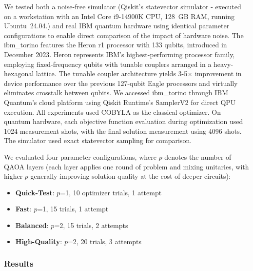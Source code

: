 \documentclass[preprint,3p,12pt,authoryear]{elsarticle}
\begin{document}
We tested both a noise-free simulator (Qiskit's statevector simulator - {\color{red}executed on a workstation with an Intel Core i9-14900K CPU, 128~GB RAM, running Ubuntu~24.04.}) and real IBM quantum hardware using identical parameter configurations to enable direct comparison of the impact of hardware noise. The ibm\_torino features the Heron r1 processor with 133 qubits, introduced in December 2023. Heron represents IBM's highest-performing processor family, employing fixed-frequency qubits with tunable couplers arranged in a heavy-hexagonal lattice. The tunable coupler architecture yields 3-5$\times$ improvement in device performance over the previous 127-qubit Eagle processors and virtually eliminates crosstalk between qubits. We accessed ibm\_torino through IBM Quantum's cloud platform using Qiskit Runtime's SamplerV2 for direct QPU execution. All experiments used COBYLA as the classical optimizer. On quantum hardware, each objective function evaluation during optimization used 1024 measurement shots, with the final solution measurement using 4096 shots. The simulator used exact statevector sampling for comparison.

We evaluated four parameter configurations, where $p$ denotes the number of QAOA layers (each layer applies one round of problem and mixing unitaries, with higher $p$ generally improving solution quality at the cost of deeper circuits):


\begin{itemize}
\item \textbf{Quick-Test}: $p$=1, 10 optimizer trials, 1 attempt
\item \textbf{Fast}: $p$=1, 15 trials, 1 attempt
\item \textbf{Balanced}: $p$=2, 15 trials, 2 attempts
\item \textbf{High-Quality}: $p$=2, 20 trials, 3 attempts
\end{itemize}

\subsubsection{Results}
\end{document}
